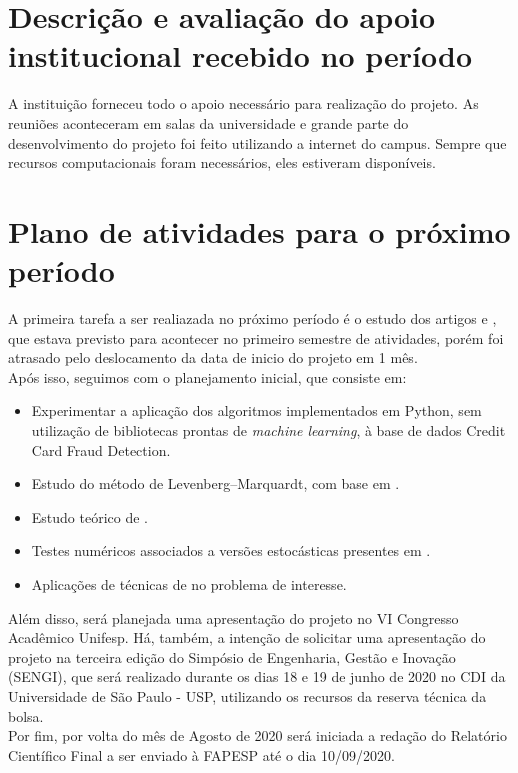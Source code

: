 \documentclass[a4paper,12pt]{article}
\begin{document}
\newpage
\section*{Descrição e avaliação do apoio institucional recebido no período}
A instituição forneceu todo o apoio necessário para realização do projeto. As reuniões aconteceram em salas da universidade e grande parte do desenvolvimento do projeto foi feito utilizando a internet do campus. Sempre que recursos computacionais foram necessários, eles estiveram disponíveis.



\newpage
\section*{Plano de atividades para o próximo período}
A primeira tarefa a ser realiazada no próximo período é o estudo dos artigos \cite{fraudeItalia2} e \cite{fraudeItalia1}, que estava previsto para acontecer no primeiro semestre de atividades, porém foi atrasado pelo deslocamento da data de inicio do projeto em 1 mês.\\

Após isso, seguimos com o planejamento inicial, que consiste em:
\begin{itemize}

\item Experimentar a aplicação dos algoritmos implementados em Python, sem utilização de bibliotecas prontas de \textit{machine learning}, à base de dados Credit Card Fraud Detection.

\item Estudo do método de Levenberg–Marquardt, com base em \cite{TCCKleber}.
\item Estudo teórico de \cite{bmLS}. 
\item Testes numéricos associados a versões estocásticas presentes em \cite{bmLS}.
\item Aplicações de técnicas de \cite{bmLS} no problema de interesse.
\end{itemize}


Além disso, será planejada uma apresentação do projeto no VI Congresso Acadêmico Unifesp. Há, também, a intenção de solicitar uma apresentação do projeto na terceira edição do Simpósio de Engenharia, Gestão e Inovação (SENGI), que será realizado durante os dias 18 e 19 de junho de 2020 no CDI da Universidade de São Paulo - USP, utilizando os recursos da reserva técnica da bolsa.\\
Por fim, por volta do mês de Agosto de 2020 será iniciada a redação do Relatório Científico Final a ser enviado à FAPESP até o dia 10/09/2020.
\end{document}
